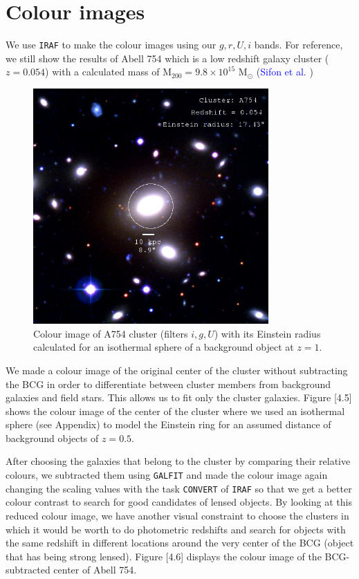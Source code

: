 \section{Colour images} 

We use \texttt{IRAF} to make the colour images using our $g,r,U,i$ bands. For reference, we still show the results of Abell 754 which is a low redshift galaxy cluster ($z=0.054$) with a calculated mass of $\text{M}_{200}=9.8\times 10^{15}$ $\text{M}_{\odot}$ (\textcolor{blue}{Sifon et al.} \citeyear{Reference9})

\begin{figure}[H]
\centering
\includegraphics[width=9cm]{images/cA754.jpg}
\caption[Colour image of A754]{Colour image of A754 cluster (filters $i,g,U$) with its Einstein radius calculated for an isothermal sphere of a background object at $z=1$.}
\end{figure}

We made a colour image of the original center of the cluster without subtracting the BCG in order to differentiate between cluster members from background galaxies and field stars. This allows us to fit only the cluster galaxies. Figure [4.5] shows the colour image of the center of the cluster where we used an isothermal sphere (see Appendix) to model the Einstein ring for an assumed distance of background objects of $z=0.5$. 

After choosing the galaxies that belong to the cluster by comparing their relative colours, we subtracted them using \texttt{GALFIT} and made the colour image again changing the scaling values with the task \texttt{CONVERT} of \texttt{IRAF} so that we get a better colour contrast to search for good candidates of lensed objects. By looking at this reduced colour image, we have another visual constraint to choose the clusters in which it would be worth to do photometric redshifts and search for objects with the same redshift in different locations around the very center of the BCG (object that has being strong lensed). Figure [4.6] displays the colour image of the BCG-subtracted center of Abell 754.

